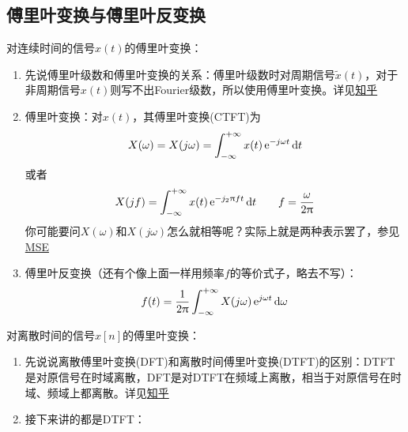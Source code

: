 \documentclass{article}
\begin{document}
\subsection{傅里叶变换与傅里叶反变换}
对连续时间的信号$x(t)$的傅里叶变换：
\begin{enumerate}[label=(\arabic*)]
	\item 先说傅里叶级数和傅里叶变换的关系：傅里叶级数时对周期信号$\tilde{x}(t)$，对于非周期信号$x(t)$则写不出Fourier级数，所以使用傅里叶变换。详见\href{https://www.zhihu.com/question/21665935}{知乎}
	\item 傅里叶变换：对$x(t)$，其傅里叶变换(CTFT)为
				\begin{equation}
					X(\omega) = X(j\omega) = \int_{-\infty}^{+\infty}x(t)\operatorname{e}^{-j\omega t}\mathop{}\!\mathrm{d} t
				\end{equation}
				或者\begin{equation}
					X(jf) = \int_{-\infty}^{+\infty}x(t)\operatorname{e}^{-j_2\uppi ft}\mathop{}\!\mathrm{d} t\qquad f=\frac{\omega}{2\uppi}
				\end{equation}
				你可能要问$X(\omega)$和$X(j\omega)$怎么就相等呢？实际上就是两种表示罢了，参见\href{https://math.stackexchange.com/questions/966414/difference-between-x-omega-and-xj-omega-notation-of-fourier-transform}{MSE}
	\item 傅里叶反变换（还有个像上面一样用频率$f$的等价式子，略去不写）：
				\begin{equation}
					f(t) = \frac{1}{2\uppi}\int_{-\infty}^{+\infty} X(j\omega)\operatorname{e}^{j\omega t} \mathop{}\!\mathrm{d}\omega
				\end{equation}
\end{enumerate}
对离散时间的信号$x[n]$的傅里叶变换：
\begin{enumerate}[label=(\arabic*)]
	\item 先说说离散傅里叶变换(DFT)和离散时间傅里叶变换(DTFT)的区别：DTFT是对原信号在时域离散，DFT是对DTFT在频域上离散，相当于对原信号在时域、频域上都离散。详见\href{https://www.zhihu.com/question/23137926}{知乎}
	\item 接下来讲的都是DTFT：
\end{enumerate}

\appendix
\end{document}
